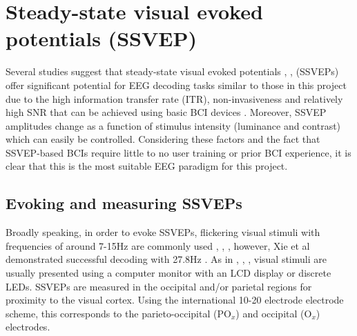 \section{Steady-state visual evoked potentials (SSVEP)}
Several studies suggest that steady-state visual evoked potentials  \cite{Fernandez-Fraga2016}, \cite{Kanoga2020}, \cite{Acampora2021} (SSVEPs) offer significant potential for EEG decoding tasks similar to those in this project due to the high information transfer rate (ITR), non-invasiveness and relatively high SNR that can be achieved using basic BCI devices \cite{Zhu2021}. Moreover, SSVEP amplitudes change as a function of stimulus intensity (luminance and contrast) \cite{autthasan-single-chan-ssvep} which can easily be controlled. Considering these factors and the fact that SSVEP-based BCIs require little to no user training or prior BCI experience, it is clear that this is the most suitable EEG paradigm for this project. 

\subsection{Evoking and measuring SSVEPs}

Broadly speaking, in order to evoke SSVEPs, flickering visual stimuli with frequencies of around 7-15Hz are commonly used \cite{Acampora2021}, \cite{Chen2017}, \cite{duart-comparing-ssvep-stimuli}, however, Xie et al demonstrated successful decoding with 27.8Hz \cite{Xie2016}. As in \cite{Acampora2021}, \cite{Chen2017}, \cite{autthasan-single-chan-ssvep}, visual stimuli are usually presented using a computer monitor with an LCD display or discrete LEDs. SSVEPs are measured in the occipital and/or parietal regions \cite{Fernandez-Fraga2016} for proximity to the visual cortex. Using the international 10-20 electrode electrode scheme, this corresponds to the parieto-occipital ($\text{PO}_x$) and occipital ($\text{O}_x$)  electrodes.

